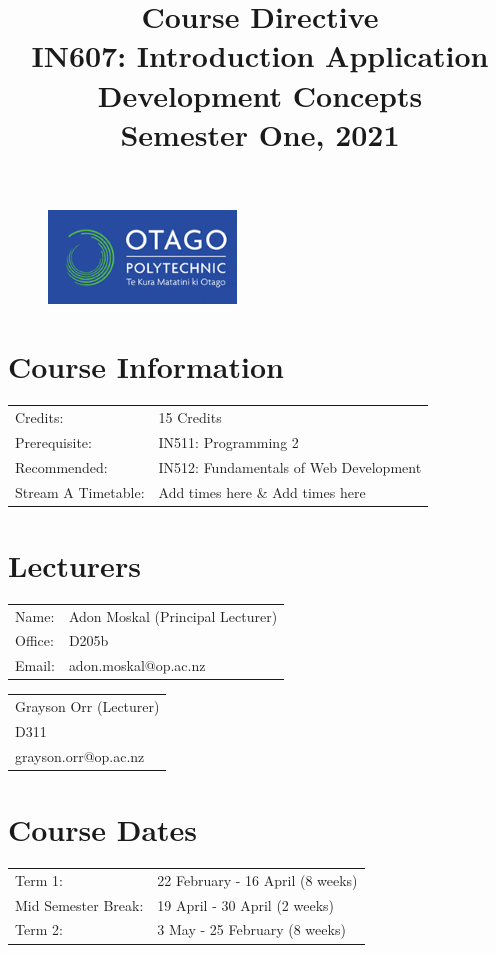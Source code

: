 \documentclass{article}
\author{}
\begin{document}
\begin{figure}
	\includegraphics[width=50mm]{./img/logo.png}
\end{figure}

\title{Course Directive\\IN607: Introduction Application Development Concepts\\Semester One, 2021}
\date{}
\maketitle

\section*{Course Information}
\begin{tabular}{ll}
	Credits:            & 15 Credits                             \\
	Prerequisite:       & IN511: Programming 2                   \\
	Recommended:        & IN512: Fundamentals of Web Development \\
	Stream A Timetable: & Add times here \& Add times here       
\end{tabular} 

\section*{Lecturers}
\begin{tabular}{ll}
	Name:   & Adon Moskal (Principal Lecturer) \\
	Office: & D205b                            \\
	Email:  & adon.moskal@op.ac.nz             \\
\end{tabular}
\begin{tabular}{l}
	Grayson Orr (Lecturer) \\
	D311                   \\
	grayson.orr@op.ac.nz   \\
\end{tabular}

\section*{Course Dates}
\begin{tabular}{ll}
	Term 1:             & 22 February - 16 April (8 weeks) \\
	Mid Semester Break: & 19 April - 30 April (2 weeks)    \\
	Term 2:             & 3 May - 25 February (8 weeks)    \\                       
\end{tabular}
\end{document}
